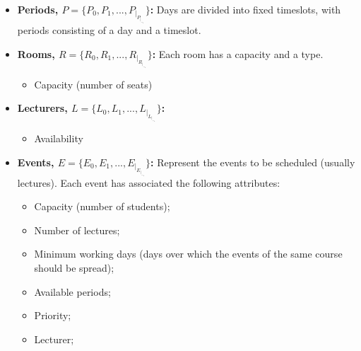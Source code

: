 \begin{itemize}
	\item \textbf{Periods, \(P = \{P_0, P_1, ..., P_|_P_|_-_1\}\):} Days are divided into fixed timeslots, with periods consisting of a day and a timeslot.


	\item \textbf{Rooms, \(R = \{R_0, R_1, ..., R_|_R_|_-_1\}\):} Each room has a capacity and a type.
		\begin{itemize}
			\item Capacity (number of seats)
		\end{itemize}

	\item \textbf{Lecturers, \(L = \{L_0, L_1, ..., L_|_L_|_-_1\}\):} 
		\begin{itemize}
			\item Availability
		\end{itemize}

	\item \textbf{Events, \(E = \{E_0, E_1, ..., E_|_E_|_-_1\}\):} Represent the events to be scheduled (usually lectures). Each event has associated the following attributes:
		\begin{itemize}
        		\item Capacity (number of students);
        		\item Number of lectures;
        		\item Minimum working days (days over which the events of the same course should be spread);
        		\item Available periods;
        		\item Priority;
        		\item Lecturer;
		\end{itemize}


\end{itemize}
